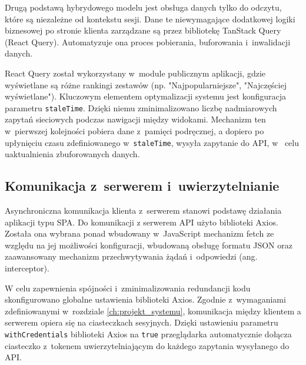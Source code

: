 

    


Drugą podstawą hybrydowego modelu jest obsługa danych tylko do odczytu, które są niezależne od kontekstu sesji. 
Dane te niewymagające dodatkowej logiki biznesowej po stronie klienta zarządzane są przez bibliotekę 
TanStack Query (React Query). Automatyzuje ona proces pobierania, buforowania i~inwalidacji danych. 

React Query został wykorzystany w~module publicznym aplikacji, gdzie wyświetlane są różne 
rankingi zestawów (np. "Najpopularniejsze", "Najczęściej wyświetlane"). Kluczowym elementem optymalizacji systemu
jest konfiguracja parametru \texttt{staleTime}. Dzięki niemu zminimalizowano liczbę nadmiarowych zapytań sieciowych 
podczas nawigacji między widokami. Mechanizm ten w~pierwszej kolejności pobiera dane z~pamięci podręcznej, 
a dopiero po upłynięciu czasu zdefiniowanego w~\texttt{staleTime}, wysyła zapytanie do API, w~
celu uaktualnienia zbuforowanych danych.

\subsection{Komunikacja z~serwerem i~uwierzytelnianie}
Asynchroniczna komunikacja klienta z~serwerem stanowi podstawę działania aplikacji typu SPA. Do komunikacji 
z serwerem API użyto biblioteki Axios. Została ona wybrana ponad wbudowany w~JavaScript mechanizm fetch ze względu na jej
możliwości konfiguracji, wbudowaną obsługę formatu JSON oraz zaawansowany mechanizm przechwytywania żądań i~odpowiedzi
(ang. interceptor).

W celu zapewnienia spójności i~zminimalizowania redundancji kodu skonfigurowano globalne ustawienia biblioteki Axios. 
Zgodnie z~wymaganiami zdefiniowanymi w~rozdziale \ref{ch:projekt_systemu}, komunikacja między klientem 
a serwerem opiera się na ciasteczkach sesyjnych. Dzięki ustawieniu parametru \texttt{withCredentials} biblioteki Axios
na \texttt{true} przeglądarka automatycznie dołącza ciasteczko z~tokenem uwierzytelniającym do każdego zapytania wysyłanego do API.

